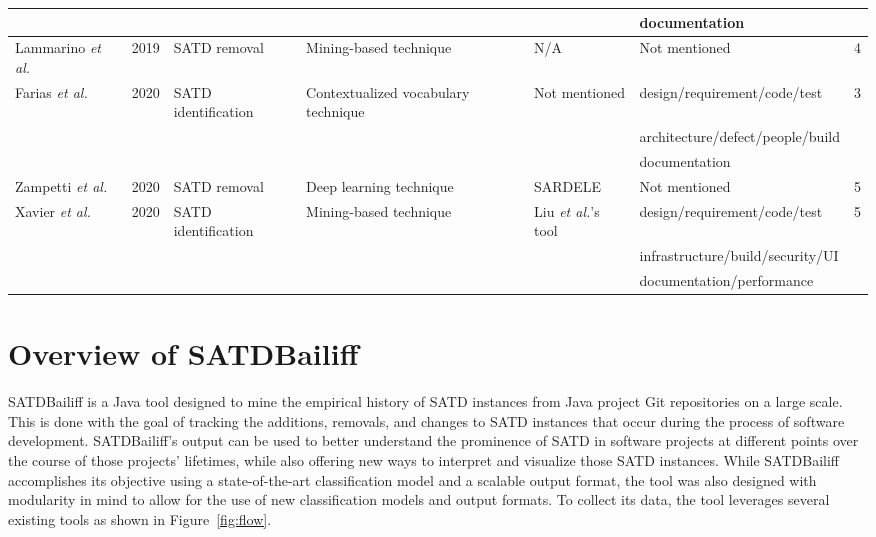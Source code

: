 \documentclass[3p]{elsarticle}
\newcommand{\approach}{SATDBailiff\xspace}
\begin{document}
\begin{table*}
\begin{adjustbox}{width=1.0\textwidth,center}
\begin{tabular}{|l|l|l|l|l|l|l|}
& & & & & documentation & \\ \hline
Lammarino \textit{et al.} \cite{iammarino2019self} & 2019 & SATD removal & Mining-based technique & N/A & Not mentioned & 4  \\ \hline
Farias \textit{et al.} \cite{de2020identifying} & 2020 & SATD identification & Contextualized vocabulary technique & Not mentioned & design/requirement/code/test & 3   \\ 
& & & & & architecture/defect/people/build & \\
& & & & & documentation & \\ \hline

Zampetti \textit{et al.} \cite{zampetti2020automatically} & 2020 & SATD removal & Deep learning technique & SARDELE & Not mentioned & 5  \\ \hline

Xavier \textit{et al.} \cite{xavier2020beyond} & 2020 & SATD identification & Mining-based technique  & Liu \textit{et al.}'s tool \cite{liu2018satd} & design/requirement/code/test & 5  \\ 
& & & & & infrastructure/build/security/UI & \\
& & & & & documentation/performance & \\ \hline
 
\end{tabular}
\end{adjustbox}
\end{table*}

\section{Overview of \approach}
\label{section:approach}

\approach is a Java tool designed to mine the empirical history of SATD instances from Java project Git repositories on a large scale.
This is done with the goal of tracking the additions, removals, and changes to SATD instances that occur during the process of software development. 
\approach's output can be used to better understand the prominence of SATD in software projects at different points over the course of those projects' lifetimes, while also offering new ways to interpret and visualize those SATD instances. While \approach accomplishes its objective using a state-of-the-art classification model \cite{liu2018satd} and a scalable output format, the tool was also designed with modularity in mind to allow for the use of new classification models and output formats.
To collect its data, the tool leverages several existing tools as shown in Figure~\ref{fig:flow}. 
\end{document}
